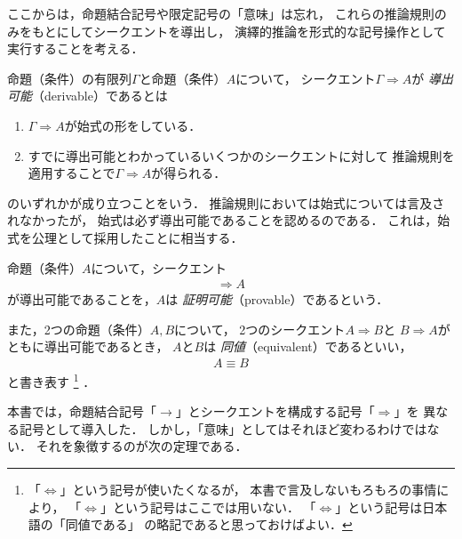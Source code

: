  ここからは，命題結合記号や限定記号の「意味」は忘れ，
 これらの推論規則のみをもとにしてシークエントを導出し，
 演繹的推論を形式的な記号操作として実行することを考える．
 
 命題（条件）の有限列$\varGamma$と命題（条件）$A$について，
 シークエント$\varGamma \Longrightarrow A$が
 \emph{導出可能}（derivable）であるとは
 \begin{enumerate}
   \item $\varGamma \Longrightarrow A$が始式の形をしている．
   \item すでに導出可能とわかっているいくつかのシークエントに対して
         推論規則を適用することで$\varGamma \Longrightarrow A$が得られる．
 \end{enumerate}
 のいずれかが成り立つことをいう．
 推論規則においては始式については言及されなかったが，
 始式は必ず導出可能であることを認めるのである．
 これは，始式を公理として採用したことに相当する．

 命題（条件）$A$について，シークエント
 \begin{align*}
   \Longrightarrow A
 \end{align*}
 が導出可能であることを，$A$は
 \emph{証明可能}（provable）であるという．

 また，2つの命題（条件）$A,  B$について，
 2つのシークエント$A \Longrightarrow B$と
 $B \Longrightarrow A$がともに導出可能であるとき，
 $A$と$B$は
   \emph{同値}（equivalent）であるといい，
 \begin{align}
   A \equiv  B
 \end{align}
 と書き表す
 \footnote{「$\Longleftrightarrow$」という記号が使いたくなるが，
 本書で言及しないもろもろの事情により，
 「$\Longleftrightarrow$」という記号はここでは用いない．
 「$\Longleftrightarrow$」という記号は日本語の「同値である」
 の略記であると思っておけばよい．
 }
 ．

 本書では，命題結合記号「$\to$」とシークエントを構成する記号「$\Longrightarrow$」を
 異なる記号として導入した．
 しかし，「意味」としてはそれほど変わるわけではない．
 それを象徴するのが次の定理である．
 
